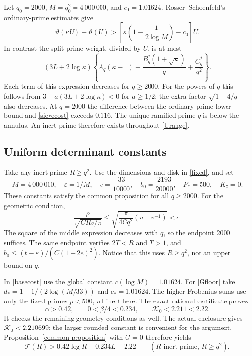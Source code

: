 \documentclass[11pt]{article}
\newcommand{\Tn}{\mathcal T}
\newcommand{\eps}{\varepsilon}
\begin{document}
Let $q_0=2000$, $M=q_0^2=4\,000\,000$, and $c_0=1.01624$.
Rosser--Schoenfeld's ordinary-prime estimates give
\[
 \vartheta(\kappa U)-\vartheta(U)
 >\left[\kappa\left(1-\frac1{2\log M}\right)-c_0\right]U.
\]
In contrast the split-prime weight, divided by $U$, is at most
\begin{equation}\label{sievecost}
 (3L+2\log\kappa)
 \left\{A_q(\kappa-1)+\frac{B_q^*(1+\sqrt\kappa)}q
                         +\frac{C_q^*}{q^2}\right\}.
\end{equation}
Each term of this expression decreases for $q\ge2000$.
For the powers of $q$ this follows from
$3-a(3L+2\log\kappa)<0$ for $a\ge1/2$; the extra factor
$\sqrt{1+4/q}$ also decreases. At $q=2000$ the difference between
the ordinary-prime lower bound and \eqref{sievecost} exceeds $0.116$.
The unique ramified prime $q$ is below the annulus. An inert prime
therefore exists throughout \eqref{Urange}.

\subsection{Uniform determinant constants}
Take any inert prime \(R\ge q^2\). Use the dimensions and disk in
\eqref{fixed}, and set
\[
 M=4\,000\,000,\quad \eps=1/M,\quad
 e=\frac{33}{10000},\quad b_0=\frac{2193}{20000},\quad
 P_*=500,\quad K_2=0.
\]
These constants satisfy the common proposition for all \(q\ge2000\).
For the geometric condition,
\[
 \frac{\rho}{\sqrt{CRv/\pi}}
 \le\sqrt{\frac{\pi}{4Cq^2}(v+v^{-1})}<e.
\]
The square of the middle expression decreases with \(q\), so the
endpoint 2000 suffices. The same endpoint verifies \(2T<R\) and
\(T>1\), and
\(b_0\le(t-\eps)/(C(1+2e)^2)\). Notice that this uses
\(R\ge q^2\), not an upper bound on \(q\).

In \eqref{basecost} use the global constant \(c(\log M)=1.01624\).
For \eqref{Gfloor} take
\(d_*=1-1/(2\log(M/33))\) and \(c_*=1.01624\).
The higher-Frobenius sums use only the fixed primes \(p<500\),
all inert here. The exact rational certificate proves
\[
 \alpha>0.42,\qquad 0<\beta/4<0.234,\qquad
 \mathcal K_0<2.211<2.22.
\]
It checks the remaining geometry conditions as well. The actual
enclosure gives \(\mathcal K_0<2.210699\); the larger rounded
constant is convenient for the argument. Proposition~\ref{common-proposition}
with \(G=0\) therefore yields
\begin{equation}\label{base}
 \Tn(R)>0.42\log R-0.234L-2.22
 \qquad(R\text{ inert prime},\ R\ge q^2).
\end{equation}
\end{document}
